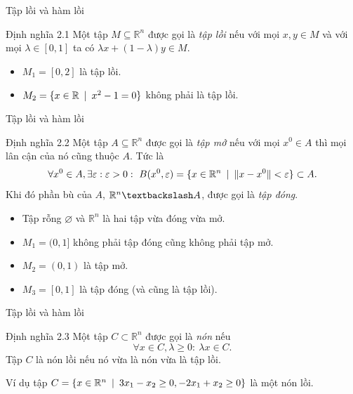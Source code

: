 \documentclass[aspectratio=169]{beamer}
\DeclarePairedDelimiter{\norm}{\lVert}{\rVert}
\theoremstyle{plain}
\theoremstyle{definition}
\theoremstyle{remark}
\begin{document}
\begin{frame}{Tập lồi và hàm lồi}\pause
\begin{block}{Định nghĩa 2.1}
    Một tập $M\subseteq \mathbb{R}^n$ được gọi là \textit{tập lồi} nếu với mọi $x,y\in M$ và với mọi $\lambda\in[0,1]$ ta có $\lambda x+(1-\lambda)y\in M$.
\end{block}
\begin{itemize}
    \item $M_1=[0,2]$ là tập lồi.
    \item $M_2=\{x\in\mathbb{R}\enskip|\enskip x^2-1 = 0\}$ không phải là tập lồi.
\end{itemize}

\end{frame}

\begin{frame}{Tập lồi và hàm lồi}
\begin{block}{Định nghĩa 2.2}
    Một tập $A\subseteq\mathbb{R}^n$ được gọi là \textit{tập mở} nếu với mọi $x^0\in A$ thì mọi lân cận của nó cũng thuộc $A$. Tức là 
    $$
    \forall x^0\in A,\exists\varepsilon: \varepsilon>0:\ B(x^0,\varepsilon) = \{x\in\mathbb{R}^n\enskip|\enskip\norm{x-x^0}<\varepsilon\}\subset A.
    $$
    Khi đó phần bù của $A$, $\mathbb{R}^n\textbackslash A$, được gọi là \textit{tập đóng}.
\end{block}
\begin{itemize}
    \item Tập rỗng $\varnothing$ và $\mathbb{R}^n$ là hai tập vừa đóng vừa mở.
    \item $M_1=(0,1]$ không phải tập đóng cũng không phải tập mở.
    \item $M_2=(0,1)$ là tập mở.
    \item $M_3=[0,1]$ là tập đóng (và cũng là tập lồi).
\end{itemize}

\end{frame}

\begin{frame}{Tập lồi và hàm lồi}
\begin{block}{Định nghĩa 2.3}
     Một tập $C\subset\mathbb{R}^n$ được gọi là \textit{nón} nếu $$ \forall x\in C, \lambda\geq0:\ \lambda x\in C. $$
     Tập $C$ là nón lồi nếu nó vừa là nón vừa là tập lồi.
\end{block}
Ví dụ tập $C=\{x\in\mathbb{R}^n\enskip|\enskip 3x_1-x_2\geq0, -2x_1+x_2\geq0\}$ là một nón lồi.
\end{frame}
\end{document}
